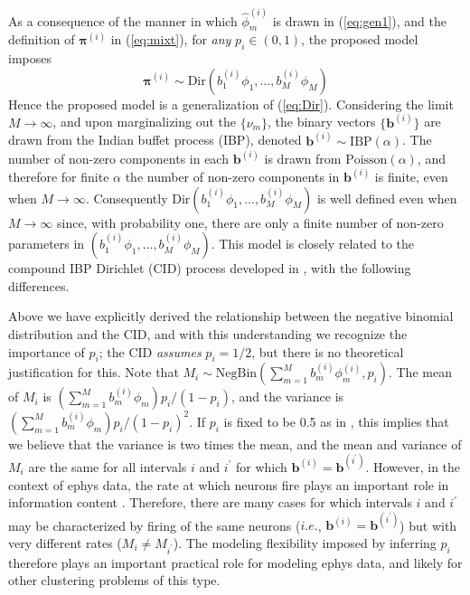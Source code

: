 \documentclass[journal]{IEEEtran}
\newcommand{\beq}{\begin{equation}}
\newcommand{\eeq}{\end{equation}}
\newcommand{\bv}{\boldsymbol{b}}
\newcommand{\piv}{\boldsymbol{\pi}}
\begin{document}
As a consequence of the manner in which $\hat{\phi}_m^{(i)}$ is drawn in (\ref{eq:gen1}), and the definition of $\piv^{(i)}$ in (\ref{eq:mixt}), for \emph{any} $p_i\in(0,1)$, the proposed model imposes
\beq \piv^{(i)}\sim\mbox{Dir}(b_1^{(i)}{\phi}_1,\dots,b_M^{(i)}{\phi}_M)\eeq
Hence the proposed model is a generalization of (\ref{eq:Dir}). Considering the limit $M\rightarrow\infty$, and upon marginalizing out the $\{\nu_m\}$, the binary vectors $\{\bv^{(i)}\}$ are drawn from the Indian buffet process (IBP), denoted $\bv^{(i)}\sim\mbox{IBP}(\alpha)$. The number of non-zero components in each $\bv^{(i)}$ is drawn from $\mbox{Poisson}(\alpha)$, and therefore for finite $\alpha$ the number of non-zero components in $\bv^{(i)}$ is finite, even when $M\rightarrow\infty$. Consequently $\mbox{Dir}(b_1^{(i)}{\phi}_1,\dots,b_M^{(i)}{\phi}_M)$ is well defined even when $M\rightarrow\infty$ since, with probability one, there are only a finite number of non-zero parameters in $(b_1^{(i)}{\phi}_1,\dots,b_M^{(i)}{\phi}_M)$. This model is closely related to the compound IBP Dirichlet (CID) process developed in \cite{compound}, with the following differences.

Above we have explicitly derived the relationship between the negative binomial distribution and the CID, and with this understanding we recognize the importance of $p_i$; the CID \emph{assumes} $p_i=1/2$, but there is no theoretical justification for this. Note that  $M_i\sim\mbox{NegBin}(\sum_{m=1}^M b_m^{(i)}{\phi}_m^{(i)},p_i)$. The mean of $M_i$ is $(\sum_{m=1}^M b_m^{(i)}{\phi}_m) p_i/(1-p_i)$, and the variance is $(\sum_{m=1}^M b_m^{(i)}{\phi}_m)p_i/(1-p_i)^2$. If $p_i$ is fixed to be  0.5 as in \cite{compound}, this implies that we believe that the variance is two times the mean, and the mean and variance of $M_i$ are the same for all intervals $i$ and $i^\prime$ for which $\bv^{(i)}=\bv^{(i^\prime)}$. However, in the context of ephys data, the rate at which neurons fire plays an important role in information content \cite{Donoghue07}. Therefore, there are many cases for which intervals $i$ and $i^\prime$ may be characterized by firing of the same neurons ($i.e.$, $\bv^{(i)}=\bv^{(i^\prime)}$) but with very different rates ($M_i\neq M_{i^\prime}$). The modeling flexibility imposed by inferring $p_i$ therefore plays an important practical role for modeling ephys data, and likely for other clustering problems of this type.
\end{document}

